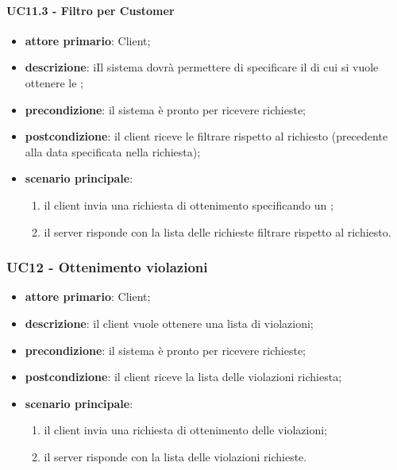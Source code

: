 \paragraph{UC11.3 - Filtro per Customer}
\begin{itemize}
	\item \textbf{attore primario}: Client;
	\item \textbf{descrizione}: iIl sistema dovrà permettere di specificare il  di cui si vuole ottenere le ;
	\item \textbf{precondizione}:  il sistema è pronto per ricevere richieste;
	\item \textbf{postcondizione}: il client riceve le  filtrare rispetto al  richiesto (precedente alla data specificata nella richiesta);
	\item \textbf{scenario principale}: 
	\begin{enumerate}
		\item  il client invia una richiesta di ottenimento  specificando un ; 
		\item  il server risponde con la lista delle  richieste filtrare rispetto al  richiesto.
	\end{enumerate}
\end{itemize}

\subsubsection{UC12 - Ottenimento violazioni}
\begin{itemize}
	\item \textbf{attore primario}: Client;
	\item \textbf{descrizione}: il client vuole ottenere una lista di violazioni;
	\item \textbf{precondizione}:  il sistema è pronto per ricevere richieste;
	\item \textbf{postcondizione}: il client riceve la lista delle violazioni richiesta;
	\item \textbf{scenario principale}: 
	\begin{enumerate}
		\item il client invia una richiesta di ottenimento delle violazioni;
		\item il server risponde con la lista delle violazioni richieste.
	\end{enumerate}
\end{itemize}
